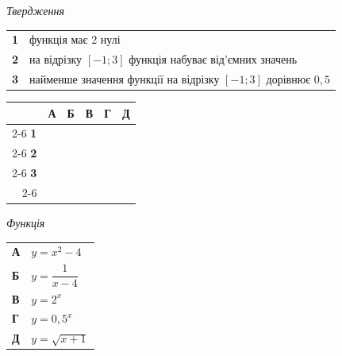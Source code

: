 \documentclass[14pt]{extarticle}
\begin{document}
\noindent
\begin{minipage}[t]{0.50\textwidth}
    \textit{Твердження} \par \vspace{0.2cm}
    \begin{tabular}{@{}p{0.5cm} p{6.5cm}@{}}
    \textbf{1} & функція має 2 нулі \\
    \textbf{2} & на відрізку $[-1; 3]$ функція набуває від'ємних значень \\
    \textbf{3} & найменше значення функції на відрізку $[-1; 3]$ дорівнює $0{,}5$ \\
    \end{tabular}
    
    \vspace{0.3cm}
    
    \begingroup
    \setlength{\tabcolsep}{4pt}
    \renewcommand{\arraystretch}{1.2}
    \small
    \begin{tabular}{r|c|c|c|c|c|}
         \multicolumn{1}{c}{} & \multicolumn{1}{c}{\textbf{А}} & \multicolumn{1}{c}{\textbf{Б}} & \multicolumn{1}{c}{\textbf{В}} & \multicolumn{1}{c}{\textbf{Г}} & \multicolumn{1}{c}{\textbf{Д}} \\ \cline{2-6}
         \textbf{1} & & & & & \\ \cline{2-6}
         \textbf{2} & & & & & \\ \cline{2-6}
         \textbf{3} & & & & & \\ \cline{2-6}
    \end{tabular}
    \endgroup
\end{minipage}%
\hfill
\begin{minipage}[t]{0.45\textwidth}
    \textit{Функція} \par \vspace{0.2cm}
    \begin{tabular}{ll}
    \textbf{А} & $y = x^2 - 4$ \\[0.2cm]
    \textbf{Б} & $y = \dfrac{1}{x-4}$ \\[0.2cm]
    \textbf{В} & $y = 2^x$ \\[0.2cm]
    \textbf{Г} & $y = 0{,}5^x$ \\[0.2cm]
    \textbf{Д} & $y = \sqrt{x+1}$ \\
    \end{tabular}
\end{minipage}

\vspace{0.7cm}
\end{document}
